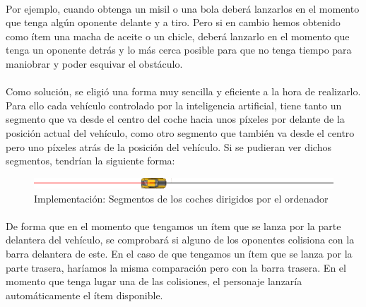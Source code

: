 \paragraph{}
Por ejemplo, cuando obtenga un misil o una bola deberá lanzarlos en el momento que tenga algún oponente delante y a tiro. Pero si
en cambio hemos obtenido como ítem una macha de aceite o un chicle, deberá lanzarlo en el momento que tenga un oponente detrás
y lo más cerca posible para que no tenga tiempo para maniobrar y poder esquivar el obstáculo.

\paragraph{}
Como solución, se eligió una forma muy sencilla y eficiente a la hora de realizarlo. Para ello cada vehículo controlado por la
inteligencia artificial, tiene tanto un segmento que va desde el centro del
coche hacia unos píxeles por delante de la posición
actual del vehículo, como otro segmento que también va desde el centro pero uno
píxeles atrás de la posición del vehículo. 
Si se pudieran ver dichos segmentos, tendrían la siguiente forma:

\begin{figure}[H]
  \label{ia_segmentos}
  \begin{center}
    \includegraphics[scale=0.8]{imagenes/ia_segmentos.png}
  \end{center}
  \caption{Implementación: Segmentos de los coches dirigidos por el ordenador}
\end{figure}

\paragraph{}
De forma que en el momento que tengamos un ítem que se lanza por la parte delantera del vehículo, se comprobará si alguno de los 
oponentes colisiona con la barra delantera de este. En el caso de que tengamos
un ítem que se lanza por la parte trasera, haríamos
la misma comparación pero con la barra trasera. En el momento que tenga lugar una de las colisiones, el personaje lanzaría
automáticamente el ítem disponible.
